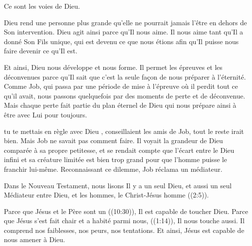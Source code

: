 Ce sont les voies de Dieu.


Dieu rend une personne plus grande qu'elle ne pourrait jamais l'être
 en dehors de Son intervention.
 Dieu agit ainsi parce qu'Il nous aime.
 Il nous aime tant qu'Il a donné Son Fils unique,
 qui est devenu ce que nous étions afin qu'Il puisse
 nous faire devenir ce qu'Il est.

Et ainsi, Dieu nous développe et nous forme.
 Il permet les épreuves et les déconvenues parce qu'Il sait
 que c'est la seule façon de nous préparer à l'éternité.
 Comme Job, qui passa par une période de mise à l'épreuve
 où il perdit tout ce qu'il avait, nous passons quelquefois
 par des moments de perte et de déconvenue.
 Mais chaque perte fait partie du plan éternel de Dieu
 qui nous prépare ainsi à être avec Lui pour toujours. 

\dvrule






 tu te mettais en règle avec Dieu \fg{},
 conseillaient les amis de Job, \og tout le reste irait bien. \fg{}
 Mais Job ne savait pas comment faire.
 Il voyait la grandeur de Dieu comparée à sa propre petitesse,
 et se rendait compte que l'écart entre le Dieu infini
 et sa créature limitée est bien trop grand pour que l'homme
 puisse le franchir lui-même.
 Reconnaissant ce dilemme, Job réclama un médiateur.

Dans le Nouveau Testament, nous lisons \og Il y a un seul Dieu,
 et aussi un seul Médiateur entre Dieu, et les hommes,
 le Christ-Jésus homme \fg{} ((2:5)).


Parce que Jésus et le Père sont un ((10:30)),
 Il est capable de toucher Dieu.
 Parce que Jésus \og s'est fait chair et a habité parmi nous, \fg{}
 ((1:14)), Il nous touche aussi.
 Il comprend nos faiblesses, nos peurs, nos tentations.
 Et ainsi, Jésus est capable de nous amener à Dieu.

